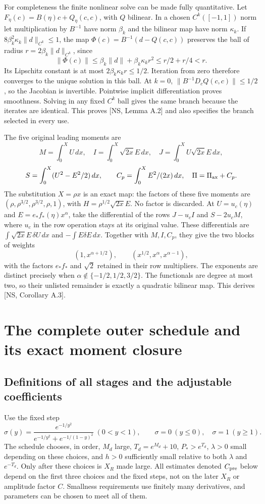 \documentclass[10pt,a4paper]{article}
\begin{document}
For completeness the finite nonlinear solve can be made fully quantitative.
Let $F_\eta(c)=B(\eta)c+Q_\eta(c,c)$, with $Q$ bilinear. In a chosen
$C^k([-1,1])$ norm let multiplication by $B^{-1}$ have norm $\beta_k$ and
the bilinear map have norm $\kappa_k$. If
$8\beta_k^2\kappa_k\|d\|_{C^k}\le1$, the map
$\Phi(c)=B^{-1}(d-Q(c,c))$ preserves the ball of radius
$r=2\beta_k\|d\|_{C^k}$, since
\[
\|\Phi(c)\|\le\beta_k\|d\|+\beta_k\kappa_kr^2
\le r/2+r/4<r.
\]
Its Lipschitz constant is at most $2\beta_k\kappa_kr\le1/2$.
Iteration from zero therefore converges to the unique solution in this ball.
At $k=0$, $\|B^{-1}D_cQ(c,c)\|\le1/2$, so the Jacobian is invertible.
Pointwise implicit differentiation proves smoothness. Solving in any fixed
$C^k$ ball gives the same branch because the iterates are identical.
This proves [NS, Lemma A.2] and also specifies the branch selected in every use.

The five original leading moments are
\[
M=\int_0^XU\,dx,\quad I=\int_0^X\sqrt{2x}E\,dx,\quad
J=\int_0^XU\sqrt{2x}E\,dx,
\]
\[
S=\int_0^X(U^2-E^2/2)\,dx,\qquad C_p=\int_0^X E^2/(2x)\,dx,
\quad\Pi=\Pi_{\rm ax}+C_p.
\]
The substitution $X=\rho x$ is an exact map: the factors of these five
moments are $(\rho,\rho^{3/2},\rho^{3/2},\rho,1)$, with
$H=\rho^{1/2}\sqrt{2x}E$. No factor is discarded. At
$U=u_c(\eta)$ and $E=e_*f_*(\eta)x^\alpha$, take the differential of
the rows $J-u_cI$ and $S-2u_cM$, where $u_c$ in the row operation stays at
its original value. These differentials are
$\int\sqrt{2x}E\,\delta U\,dx$ and $-\int E\delta E\,dx$.
Together with $M,I,C_p$, they give the two blocks of weights
\[
(1,x^{\alpha+1/2}),\qquad (x^{1/2},x^\alpha,x^{\alpha-1}),
\]
with the factors $e_*f_*$ and $\sqrt2$ retained in their row multipliers.
The exponents are distinct precisely when
$\alpha\notin\{-1/2,1/2,3/2\}$.
The functionals are degree at most two, so their unlisted remainder is
exactly a quadratic bilinear map. This derives [NS, Corollary A.3].


\section{The complete outer schedule and its exact moment closure}\label{pa:sec:component-outer}
\subsection{Definitions of all stages and the adjustable coefficients}
Use the fixed step
\[
\sigma(y)=\frac{e^{-1/y^2}}{e^{-1/y^2}+e^{-1/(1-y)^2}}\ (0<y<1),
\qquad \sigma=0\ (y\le0),\quad\sigma=1\ (y\ge1).
\]
The schedule chooses, in order, $M_d$ large, $T_d=e^{M_d}+10$,
$P_*>e^{T_d}$, $\lambda>0$ small depending on these choices, and
$h>0$ sufficiently small relative to both $\lambda$ and $e^{-T_d}$.
Only after these choices is $X_R$ made large. All estimates denoted $C_{\rm pre}$
below depend on the first three choices and the fixed steps, not on the later
$X_R$ or amplitude factor $C$. Smallness requirements use finitely many
derivatives, and parameters can be chosen to meet all of them.
\end{document}
